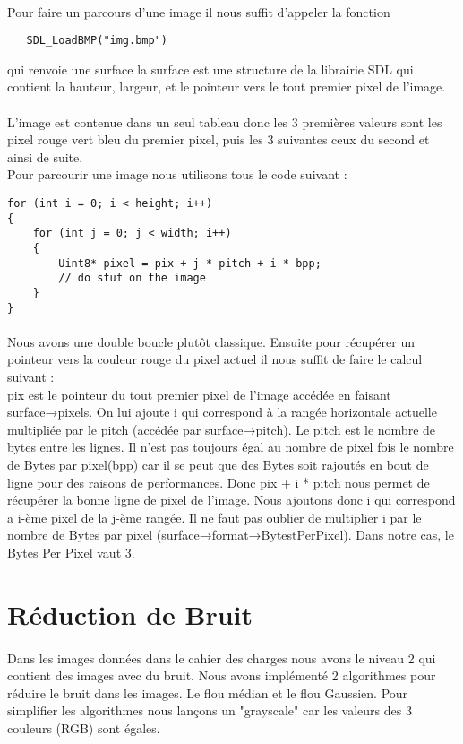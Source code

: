 \documentclass{article}
\begin{document}
\paragraph{}
Pour faire un parcours d’une image il nous suffit d’appeler la fonction 
\begin{lstlisting}
   SDL_LoadBMP("img.bmp")
\end{lstlisting}
qui renvoie une surface la surface est une structure de la librairie SDL qui contient la hauteur, largeur, et le pointeur vers le tout premier pixel de l’image.
\paragraph{}
L’image est contenue dans un seul tableau donc les 3 premières valeurs sont les pixel rouge vert bleu du premier pixel, puis les 3 suivantes ceux du second et ainsi de suite. \\
Pour parcourir une image nous utilisons tous le code suivant :
\begin{lstlisting}
for (int i = 0; i < height; i++) 
{
    for (int j = 0; j < width; i++) 
    {
        Uint8* pixel = pix + j * pitch + i * bpp;
        // do stuf on the image
    }
}
\end{lstlisting}
\paragraph{}
Nous avons une double boucle plutôt classique. Ensuite pour récupérer un pointeur vers la couleur rouge du pixel actuel il nous suffit de faire le calcul suivant :
\\
pix est le pointeur du tout premier pixel de l’image accédée en faisant surface→pixels. On lui ajoute i qui correspond à la rangée horizontale actuelle multipliée par le pitch (accédée par surface→pitch). Le pitch est le nombre de bytes entre les lignes. Il n’est pas toujours égal au nombre de pixel fois le nombre de Bytes par pixel(bpp) car il se peut que des Bytes soit rajoutés en bout de ligne pour des raisons de performances. Donc pix + i * pitch nous permet de récupérer la bonne ligne de pixel de l’image. Nous ajoutons donc i qui correspond a i-ème pixel de la j-ème rangée. Il ne faut pas oublier de multiplier i par le nombre de Bytes par pixel (surface→format→BytestPerPixel). Dans notre cas, le Bytes Per Pixel vaut 3.
\section{Réduction de Bruit}
\paragraph{}
Dans les images données dans le cahier des charges nous avons le niveau 2 qui contient des images avec du bruit. Nous avons implémenté 2 algorithmes pour réduire le bruit dans les images. Le flou médian et le flou Gaussien. Pour simplifier les algorithmes nous lançons un "grayscale" car les valeurs des 3 couleurs (RGB) sont égales.
\end{document}
